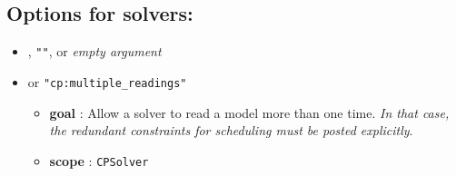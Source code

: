 \begin{itemize}
	\end{itemize}

	
\subsection{Options for solvers:}
	\begin{itemize}	
		\item {}, \texttt{""}, or \textit{empty argument}
		\item \label{smultiplereading:smultiplereadingoptions}\hypertarget{smultiplereading:smultiplereadingoptions}{}		
		 or \texttt{"cp:multiple\_readings"}
		\begin{itemize}
				\item \textbf{goal} : Allow a solver to read a model more than one time. \textit{In that case, the redundant constraints for scheduling must be posted explicitly}.
				\item \textbf{scope} : \texttt{CPSolver}
		\end{itemize}
	\end{itemize}
